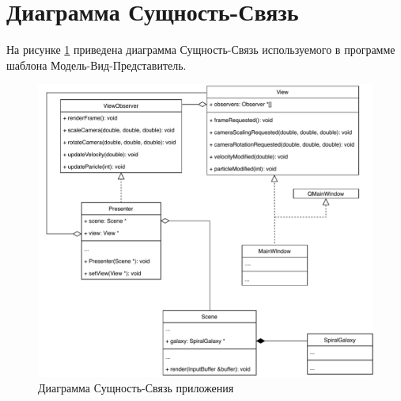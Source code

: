 \section{Диаграмма Сущность-Связь}
На рисунке \ref{img:mvp_uml} приведена диаграмма Сущность-Связь используемого в программе шаблона Модель-Вид-Представитель.
\begin{figure}[H]
    \centering
    \includegraphics[scale=0.8]{pdf/mvp_uml.pdf}
    \caption{Диаграмма Сущность-Связь приложения}
    \label{img:mvp_uml}
\end{figure}

